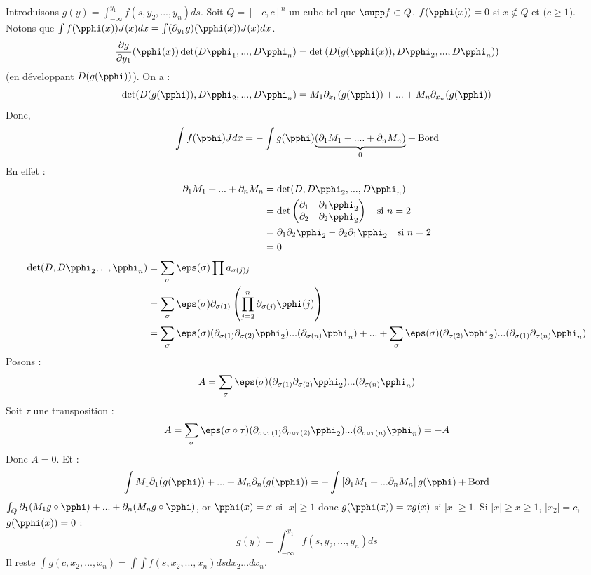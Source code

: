 \prvv
Introduisons $g(y)=\int_{-\infty}^{y_1}f(s,y_2,...,y_n)ds$. Soit $Q=[-c,c]^n$ un cube tel que $\supp f\subset Q$. $f(\pphi(x))=0$ si $x\notin Q$ et ($c\ge 1$).
\dl Notons que $\int f(\pphi(x))J(x)dx=\int(\partial_{y_1}g)(\pphi(x))J(x)dx$.
$$\frac{\partial g}{\partial y_1}(\pphi(x))\det(D\pphi_1,...,D\pphi_n)=\det\left(D(g(\pphi(x)),D\pphi_2,...,D\pphi_n)\right)$$
(en développant $D(g(\pphi))$). On a :
$$\det(D(g(\pphi)),D\pphi_2,...,D\pphi_n)=M_1\partial_{x_1}(g(\pphi))+...+M_n\partial_{x_n}(g(\pphi))$$
Donc,
$$\int f(\pphi)Jdx=-\int g(\pphi)\underset{0}{\underbrace{\left(\partial_1M_1+....+\partial_nM_n\right)}}+\text{Bord}$$
En effet :
\begin{align*}
  \partial_1M_1+...+\partial_nM_n&=\det(D,D\pphi_2,...,D\pphi_n)\\
  &=\det\begin{pmatrix}\partial_1&\partial_1\pphi_2\\\partial_2&\partial_2\pphi_2\end{pmatrix}\quad\text{si }n=2\\
    &=\partial_1\partial_2\pphi_2-\partial_2\partial_1\pphi_2\quad\text{si }n=2\\
  &=0
\end{align*}
\begin{align*}
  \det(D,D\pphi_2,...,\pphi_n)&=\sum_{\sigma}\eps(\sigma)\prod a_{\sigma(j)j}\\
    &=\sum_\sigma\eps(\sigma)\partial_{\sigma(1)}\left(\prod_{j=2}^n\partial_{\sigma(j)}\pphi(j)\right)\\
    &=\sum_\sigma\eps(\sigma)(\partial_{\sigma(1)}\partial_{\sigma(2)}\pphi_2)...(\partial_{\sigma(n)}\pphi_n)+...+\sum_\sigma\eps(\sigma)(\partial_{\sigma(2)}\pphi_2)...(\partial_{\sigma(1)}\partial_{\sigma(n)}\pphi_n)
\end{align*}
Posons :
    $$A=\sum_\sigma\eps(\sigma)(\partial_{\sigma(1)}\partial_{\sigma(2)}\pphi_2)...(\partial_{\sigma(n)}\pphi_n)$$
Soit $\tau$ une transposition :
    $$A=\sum_\sigma\eps(\sigma\circ\tau)(\partial_{\sigma\circ\tau(1)}\partial_{\sigma\circ\tau(2)}\pphi_2)...(\partial_{\sigma\circ\tau(n)}\pphi_n)=-A$$
Donc $A=0$. Et :
$$\int M_1\partial_1(g(\pphi))+...+M_n\partial_n(g(\pphi))=-\int\left[\partial_1M_1+...\partial_nM_n\right]g(\pphi)+\text{Bord}$$
$\int_Q\partial_1(M_1g\circ\pphi)+...+\partial_n(M_ng\circ\pphi)$, or $\pphi(x)=x$ si $|x|\ge 1$ donc $g(\pphi(x))=xg(x)$ si $|x|\ge 1$. Si $|x|\ge x\ge 1$, $|x_2|=c$, $g(\pphi(x))=0$ :
$$g(y)=\int_{-\infty}^{y_1}f(s,y_2,...,y_n)ds$$
Il reste $\int g(c,x_2,...,x_n)=\int\int f(s,x_2,...,x_n)ds dx_2...dx_n$. 
\prvf

